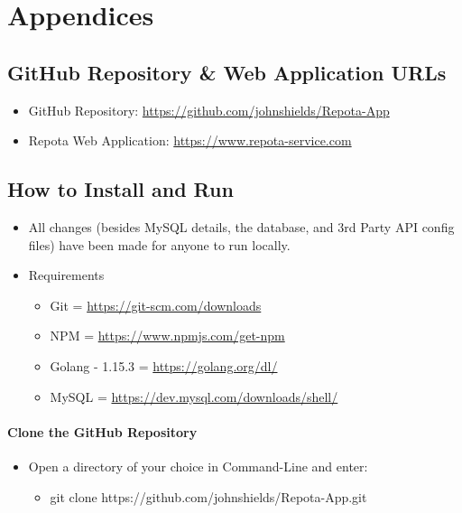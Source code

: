 \chapter{Appendices}

\section{GitHub Repository \& Web Application URLs}
\begin{itemize}
    \item GitHub Repository: 
    \url{https://github.com/johnshields/Repota-App}
    \item Repota Web Application: 
    \url{https://www.repota-service.com}
\end{itemize}

\section{How to Install and Run}
\begin{itemize}
\item All changes (besides MySQL details, the database, and 3rd Party API config files) have been made for anyone to run locally.
\end{itemize}

\begin{itemize}
  \item Requirements
    \begin{itemize}
    \item Git = \url{https://git-scm.com/downloads}
    \item NPM = \url{https://www.npmjs.com/get-npm}
    \item Golang - 1.15.3 = \url{https://golang.org/dl/}
    \item MySQL = \url{https://dev.mysql.com/downloads/shell/}
    \end{itemize}
\end{itemize}

\subsubsection{Clone the GitHub Repository}
\begin{itemize}
  \item Open a directory of your choice in Command-Line and enter:
    \begin{itemize}
    \item git clone https://github.com/johnshields/Repota-App.git
    \end{itemize}
\end{itemize}

